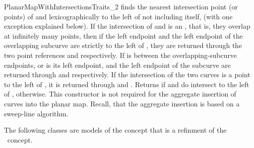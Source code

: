 \begin{ccRefConcept}{PlanarMapWithIntersectionsTraits_2}
	 {finds the nearest intersection point (or points) of  and
	    lexicographically to the left of  not including
	    itself, (with one exception explained below).
	   If the intersection of  and  is an
	   , that is, they overlap at infinitely many
	   points, then if the left endpoint and the left endpoint of the
	   overlapping subcurve are strictly to the left of , they are
	   returned through the two point references  and 
	   respectively. If  is between the overlapping-subcurve
	   endpoints, or  is its left endpoint,  and the left
	   endpoint of the subcurve are returned through  and 
	   respectively. If the intersection of the two curves is a point to the
	   left of , it is returned through  and .
	   Returns  if  and  do intersect to the left
	   of ,  otherwise. This constructor is not
	   required for the aggregate insertion of curves into the planar map.
	   Recall, that the aggregate insertion is based on a sweep-line
	   algorithm.}

\ccHasModels
The following classes are models of the 
 concept that is a refinment of the \ccRefName\
concept. 

  \\
  \\
  \\
   \\
   \\

\end{ccRefConcept}

\ccRefPageEnd
